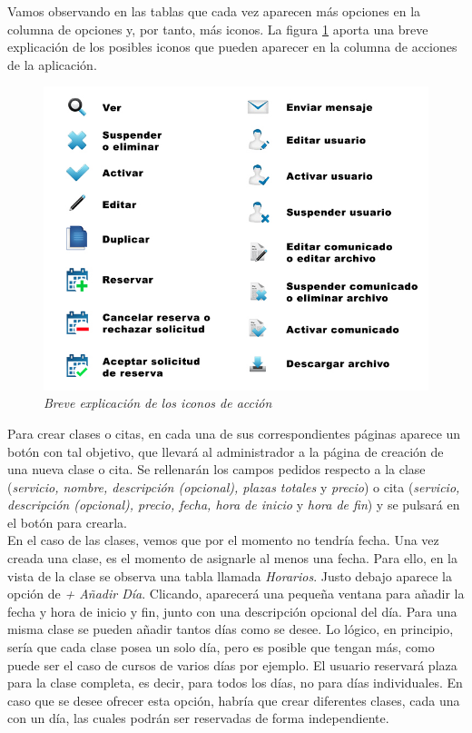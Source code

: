 Vamos observando en las tablas que cada vez aparecen más opciones en la columna de opciones y, por tanto, más iconos. La figura \ref{fig:explicacion-iconos} aporta una breve explicación de los posibles iconos que pueden aparecer en la columna de acciones de la aplicación. 

\begin{figure}
\centering
  \includegraphics[scale=.50]{img/manual/explicacion-iconos.jpg}
  \caption{\textit{Breve explicación de los iconos de acción}}
  \label{fig:explicacion-iconos}
\end{figure}

Para crear clases o citas, en cada una de sus correspondientes páginas aparece un botón con tal objetivo, que llevará al administrador a la página de creación de una nueva clase o cita. Se rellenarán los campos pedidos respecto a la clase (\textit{servicio, nombre, descripción (opcional), plazas totales} y \textit{precio}) o cita (\textit{servicio, descripción (opcional), precio, fecha, hora de inicio} y \textit{hora de fin}) y se pulsará en el botón para crearla. \\

En el caso de las clases, vemos que por el momento no tendría fecha. Una vez creada una clase, es el momento de asignarle al menos una fecha. Para ello, en la vista de la clase se observa una tabla llamada \textit{Horarios}. Justo debajo aparece la opción de \textit{+ Añadir Día}. Clicando, aparecerá una pequeña ventana para añadir la fecha y hora de inicio y fin, junto con una descripción opcional del día. Para una misma clase se pueden añadir tantos días como se desee. Lo lógico, en principio, sería que cada clase posea un solo día, pero es posible que tengan más, como puede ser el caso de cursos de varios días por ejemplo. El usuario reservará plaza para la clase completa, es decir, para todos los días, no para días individuales. En caso que se desee ofrecer esta opción, habría que crear diferentes clases, cada una con un día, las cuales podrán ser reservadas de forma independiente. \\

